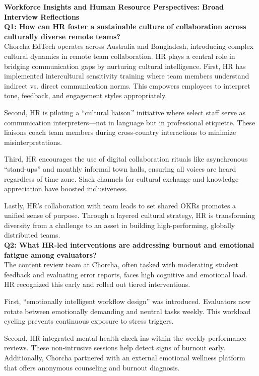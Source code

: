 \documentclass[12pt,a4paper,oneside]{book}
\begin{document}
\textbf{Workforce Insights and Human Resource Perspectives: Broad Interview Reflections}\\

\textbf{Q1: How can HR foster a sustainable culture of collaboration across culturally diverse remote teams?} \\


Chorcha EdTech operates across Australia and Bangladesh, introducing complex cultural dynamics in remote team collaboration. HR plays a central role in bridging communication gaps by nurturing cultural intelligence. First, HR has implemented intercultural sensitivity training where team members understand indirect vs. direct communication norms. This empowers employees to interpret tone, feedback, and engagement styles appropriately.

Second, HR is piloting a “cultural liaison” initiative where select staff serve as communication interpreters—not in language but in professional etiquette. These liaisons coach team members during cross-country interactions to minimize misinterpretations.

Third, HR encourages the use of digital collaboration rituals like asynchronous “stand-ups” and monthly informal town halls, ensuring all voices are heard regardless of time zone. Slack channels for cultural exchange and knowledge appreciation have boosted inclusiveness.

Lastly, HR’s collaboration with team leads to set shared OKRs promotes a unified sense of purpose. Through a layered cultural strategy, HR is transforming diversity from a challenge to an asset in building high-performing, globally distributed teams.\\

\textbf{Q2: What HR-led interventions are addressing burnout and emotional fatigue among evaluators?} \\

The content review team at Chorcha, often tasked with moderating student feedback and evaluating error reports, faces high cognitive and emotional load. HR recognized this early and rolled out tiered interventions.

First, “emotionally intelligent workflow design” was introduced. Evaluators now rotate between emotionally demanding and neutral tasks weekly. This workload cycling prevents continuous exposure to stress triggers.

Second, HR integrated mental health check-ins within the weekly performance reviews. These non-intrusive sessions help detect signs of burnout early. Additionally, Chorcha partnered with an external emotional wellness platform that offers anonymous counseling and burnout diagnosis.
\end{document}
